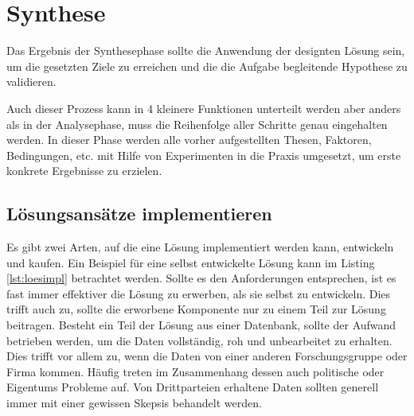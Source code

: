 \section{Synthese}

Das Ergebnis der Synthesephase sollte die Anwendung der designten Lösung sein, um die gesetzten Ziele 
zu erreichen und die die Aufgabe begleitende Hypothese zu validieren.

Auch dieser Prozess kann in 4 kleinere Funktionen unterteilt werden aber anders als in der 
Analysephase, muss die Reihenfolge aller Schritte genau eingehalten werden. In dieser Phase werden 
alle vorher aufgestellten Thesen, Faktoren, Bedingungen, etc. mit Hilfe von Experimenten in die 
Praxis umgesetzt, um erste konkrete Ergebnisse zu erzielen.


    \subsection{Lösungsansätze implementieren}

    Es gibt zwei Arten, auf die eine Lösung implementiert werden kann, entwickeln und kaufen. 
    Ein Beispiel für eine selbst entwickelte Lösung kann im Listing \ref{lst:loesimpl} betrachtet werden.
    Sollte es den Anforderungen entsprechen, ist es fast immer effektiver die Lösung zu erwerben, 
    als sie selbst zu entwickeln. Dies trifft auch zu, sollte die erworbene Komponente nur zu einem 
    Teil zur Lösung beitragen. 
    Besteht ein Teil der Lösung aus einer Datenbank, sollte der Aufwand betrieben werden, um die Daten 
    vollständig, roh und unbearbeitet zu erhalten. Dies trifft vor allem zu, wenn die Daten von einer 
    anderen Forschungsgruppe oder Firma kommen. Häufig treten im Zusammenhang dessen auch politische 
    oder Eigentums Probleme auf. Von Drittparteien erhaltene Daten sollten generell immer mit einer 
    gewissen Skepsis behandelt werden.


